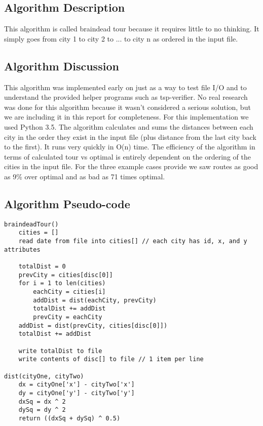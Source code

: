 \documentclass[../report/main.tex]{subfiles}
\begin{document}
\subsection*{Algorithm Description}

This algorithm is called braindead tour because it requires little to no thinking.  It simply goes from city 1 to city 2 to ... to city n as ordered in the input file.

\subsection*{Algorithm Discussion}

This algorithm was implemented early on just as a way to test file I/O and to understand the provided helper programs such as tsp-verifier.  No real research was done for this algorithm because it wasn't considered a serious solution, but we are including it in this report for completeness.  For this implementation we used Python 3.5.  The algorithm calculates and sums the distances between each city in the order they exist in the input file (plus distance from the last city back to the first).  It runs very quickly in O(n) time.  The efficiency of the algorithm in terms of calculated tour vs optimal is entirely dependent on the ordering of the cities in the input file.  For the three example cases provide we saw routes as good as 9\% over optimal and as bad as 71 times optimal.

\subsection*{Algorithm Pseudo-code}

\begin{verbatim}
braindeadTour()
    cities = []
    read date from file into cities[] // each city has id, x, and y attributes

    totalDist = 0
    prevCity = cities[disc[0]]
    for i = 1 to len(cities)
        eachCity = cities[i]
        addDist = dist(eachCity, prevCity)
        totalDist += addDist
        prevCity = eachCity
    addDist = dist(prevCity, cities[disc[0]])
    totalDist += addDist

    write totalDist to file
    write contents of disc[] to file // 1 item per line

dist(cityOne, cityTwo)
    dx = cityOne['x'] - cityTwo['x']
    dy = cityOne['y'] - cityTwo['y']
    dxSq = dx ^ 2
    dySq = dy ^ 2
    return ((dxSq + dySq) ^ 0.5)
\end{verbatim}
\end{document}
